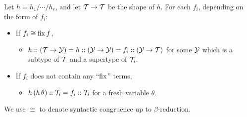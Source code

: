 \Obligations Let $h=h_1/\cdots/h_r$, and let $\mathcal{T}\to\mathcal{T}$ be the shape of $h$. 
  For each $f_i$, depending on the form of $f_i$:
\begin{itemize}
  \item If $f_i \cong \operatorname{fix} f$,
  \begin{itemize}
    \item $h :: (\mathcal{T} \to \mathcal{Y}) = h :: (\mathcal{Y} \to \mathcal{Y}) = f_i :: (\mathcal{Y} \to \mathcal{T})$
    for some $\mathcal{Y}$ which is a subtype of $\mathcal{T}$ and a supertype of $\mathcal{T}_i$.
  \end{itemize}
  \item If $f_i$ does not contain any ``$\operatorname{fix}$'' terms,
  \begin{itemize}
    \item $h\,(h\,\theta) :: \mathcal{T}_i = f_i :: \mathcal{T}_i$ for a fresh variable $\theta$.
  \end{itemize}
\end{itemize}

We use $\cong$ to denote syntactic congruence up to $\beta$-reduction.

\begin{comment}
\Obligations Let $h=h_1/\cdots/h_r$, let $\overline\theta\!=\!\theta_{1..r}$ be $r$ fresh variables, and let
$f = \theta_{1..r} \mapsto (f_1\,\theta_1)::\T_1/\cdots/(f_r\,\theta_r)::\T_r$.
\begin{itemize}
  \item $\T_{1..r}$ are disjoint mappings.
  \item {\bf Either}\quad $h\,(f\,\overline\theta) = f\,\overline\theta$ \\{\bf or}\qquad
  $\begin{array}[t]{l} h\,\theta=\theta ~\limplies~ (f_i\,\theta :: \T_i)=\theta :: \T_i ~, \\
  \theta::\T_1~/~\cdots~/~\theta::\T_r=\theta\end{array}$
\end{itemize}

(We give two alternatives, as the first is usually easier to prove, but may hold in less cases)
\end{comment}


\newenvironment{tacticbox}[1]{\begin{center}\begin{tabular}{|@{~~~~}l@{~~~~}|}\hline\rule{0pt}{2.3ex}\underline{#1}\\[.4em]$}{$\\[-1em] \\[.3ex] \hline\end{tabular}\end{center}}

